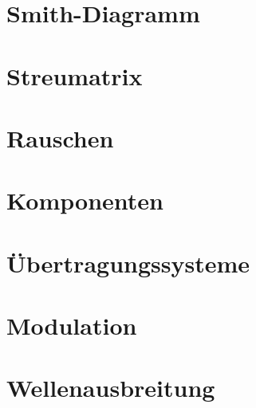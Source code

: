 \documentclass{report}
\begin{document}
\chapter{Smith-Diagramm}

\chapter{Streumatrix}

\chapter{Rauschen}

\chapter{Komponenten}

\chapter{Übertragungssysteme}

\chapter{Modulation}

\chapter{Wellenausbreitung}
\end{document}
